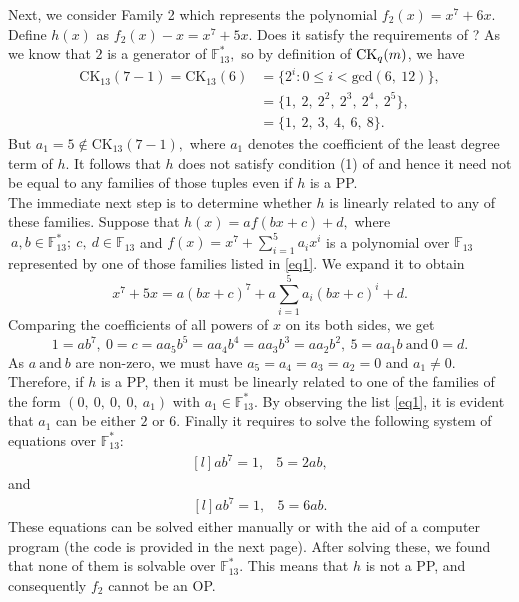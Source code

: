 \documentclass[12pt,a4wide, reqno]{amsart}
\theoremstyle{definition}
\theoremstyle{remark}
\numberwithin{equation}{section}
\begin{document}
Next, we consider Family 2 which represents the polynomial $f_2(x)=x^7+6x.$ Define $h(x)$ as $f_2(x)-x=x^7+5x.$ Does it satisfy the requirements of ? As we know that $2$ is a generator of $\mathbb{F}_{13}^*,$ so by definition of $\textup{CK}_q(m)$, we have
\begin{equation*}
    \begin{aligned}
        \text{CK}_{13}(7-1)=\text{CK}_{13}(6)&=\{2^i: 0\leq i < \text{gcd}(6,~12)\},\\
        &=\{1,~2,~2^2,~2^3,~2^4,~2^5\},\\
        &=\{1,~2,~3,~4,~6,~8\}.
    \end{aligned}
\end{equation*}
But $a_1=5\notin\text{CK}_{13}(7-1),$ where $a_1$ denotes the coefficient of the least degree term of $h.$ It follows that $h$ does not satisfy condition (1) of  and hence it need not be equal to any families of those tuples even if $h$ is a PP. \\The immediate next step is to determine whether $h$ is linearly related to any of these families. Suppose that $h(x)=af(bx+c)+d,$ where $~a,b\in\mathbb{F}_{13}^*;~c,~d\in\mathbb{F}_{13}$ and $f(x)=x^7+\sum_{i=1}^{5}a_ix^i$ is a polynomial over $\mathbb{F}_{13}$ represented by one of those families listed in \ref{eq1}. We expand it to obtain
$$x^7+5x=a(bx+c)^7+a\displaystyle\sum_{i=1}^{5}a_i(bx+c)^i+d.$$
Comparing the coefficients of all powers of $x$ on its both sides, we get
$$1=ab^7,~0=c=aa_5b^5=aa_4b^4=aa_3b^3=aa_2b^2,~5=aa_1b~\text{and}~0=d.$$
As $a~\text{and}~b$ are non-zero, we must have $a_5=a_4=a_3=a_2=0$ and $a_1\neq 0.$ Therefore, if $h$ is a PP, then it must be linearly related to one of the families of the form $(0,~0,~0,~0,~a_1)$ with $a_1\in\mathbb{F}_{13}^*.$ By observing the list \ref{eq1}, it is evident that $a_1$ can be either $2$ or $6.$ Finally it requires to solve the following system of equations over $\mathbb{F}_{13}^*:$
\begin{equation}
    \begin{matrix*}[l]
         ab^7=1, & 5=2ab,
    \end{matrix*}
\end{equation}
and
\begin{equation}
    \begin{matrix*}[l]
         ab^7=1, & 5=6ab.
    \end{matrix*}
\end{equation}
These equations can be solved either manually or with the aid of a computer program (the code is provided in the next page). After solving these, we found that none of them is solvable over $\mathbb{F}_{13}^*.$ This means that $h$ is not a PP, and consequently $f_2$ cannot be an OP. 
\end{document}
